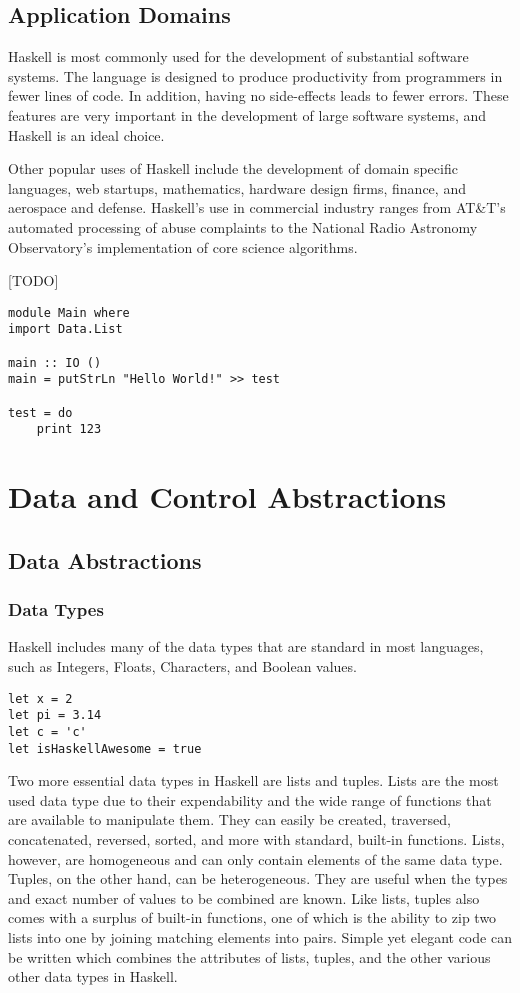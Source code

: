 \documentclass[titlepage,12pt]{article}
\begin{document}
\subsection{Application Domains}

Haskell is most commonly used for the development of substantial software systems. The language is designed to produce productivity from programmers in fewer lines of code. In addition, having no side-effects leads to fewer errors. These features are very important in the development of large software systems, and Haskell is an ideal choice. 

Other popular uses of Haskell include the development of domain specific languages, web startups, mathematics, hardware design firms, finance, and aerospace and defense. Haskell's use in commercial industry ranges from AT\&T's automated processing of abuse complaints to the National Radio Astronomy Observatory’s implementation of core science algorithms.


[TODO]~\cite{learnyouahaskell}
\begin{verbatim}
module Main where
import Data.List

main :: IO ()
main = putStrLn "Hello World!" >> test

test = do 
    print 123
\end{verbatim}

\section{Data and Control Abstractions}


\subsection{Data Abstractions}
\subsubsection{Data Types}

Haskell includes many of the data types that are standard in most languages, such as Integers, Floats, Characters, and Boolean values. 

 

\begin{verbatim}
let x = 2
let pi = 3.14
let c = 'c'
let isHaskellAwesome = true
\end{verbatim}

Two more essential data types in Haskell are lists and tuples. Lists are the most used data type due to their expendability and the wide range of functions that are available to manipulate them. They can easily be created, traversed, concatenated, reversed, sorted, and more with standard, built-in functions. Lists, however, are homogeneous and can only contain elements of the same data type. Tuples, on the other hand, can be heterogeneous. They are useful when the types and exact number of values to be combined are known. Like lists, tuples also comes with a surplus of built-in functions, one of which is the ability to zip two lists into one by joining matching elements into pairs. Simple yet elegant code can be written which combines the attributes of lists, tuples, and the other various other data types in Haskell.
\end{document}
